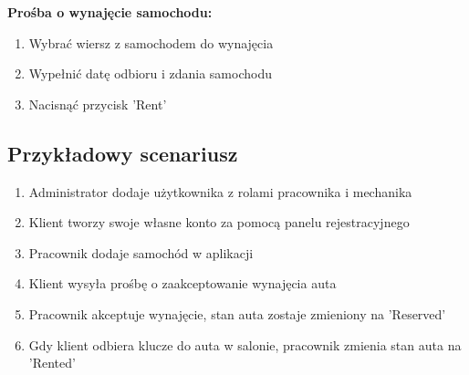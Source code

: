 \documentclass{article}
\begin{document}
\textbf{Prośba o wynajęcie samochodu:}

\begin{enumerate}
    \item Wybrać wiersz z samochodem do wynajęcia
    \item Wypełnić datę odbioru i zdania samochodu
    \item Nacisnąć przycisk 'Rent'
\end{enumerate}

\subsection{Przykładowy scenariusz}
\vspace{1em}

\begin{enumerate}
    \item Administrator dodaje użytkownika z rolami pracownika i mechanika 
    \item Klient tworzy swoje własne konto za pomocą panelu rejestracyjnego
    \item Pracownik dodaje samochód w aplikacji
    \item Klient wysyła prośbę o zaakceptowanie wynajęcia auta
    \item Pracownik akceptuje wynajęcie, stan auta zostaje zmieniony na 'Reserved'
    \item Gdy klient odbiera klucze do auta w salonie, pracownik zmienia stan auta na 'Rented'
\end{enumerate}
\end{document}
